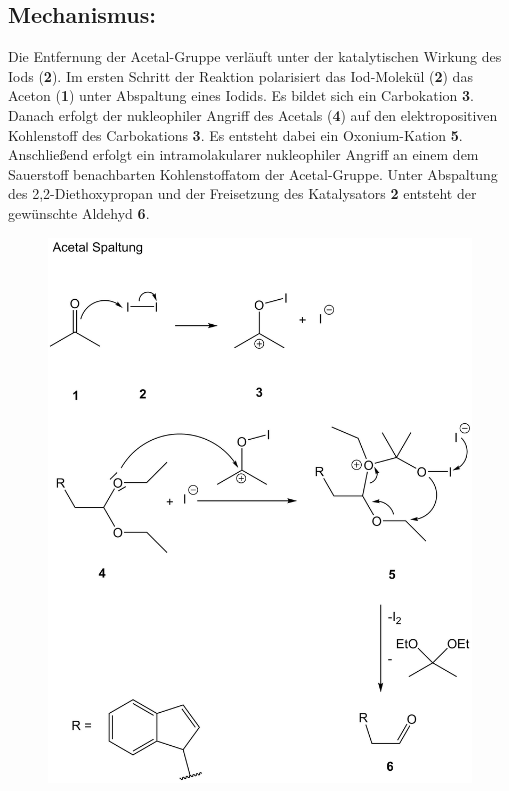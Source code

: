 \documentclass[12pt]{article}
\begin{document}
\begin{onehalfspace}
\section{Mechanismus\cite{bio}:}
Die Entfernung der Acetal-Gruppe verläuft unter der katalytischen Wirkung des Iods (\textbf{2}). 
Im ersten Schritt der Reaktion polarisiert das Iod-Molekül (\textbf{2}) das Aceton (\textbf{1}) unter Abspaltung eines Iodids. Es bildet sich ein Carbokation \textbf{3}. Danach erfolgt der nukleophiler Angriff des Acetals (\textbf{4}) auf den elektropositiven Kohlenstoff des Carbokations \textbf{3}. 
Es entsteht dabei ein Oxonium-Kation \textbf{5}. Anschließend erfolgt ein intramolakularer nukleophiler Angriff an einem dem Sauerstoff benachbarten Kohlenstoffatom der Acetal-Gruppe. Unter Abspaltung des 2,2-Diethoxypropan und der Freisetzung des Katalysators \textbf{2} entsteht der gewünschte Aldehyd \textbf{6}.
\noindent
\begin{figure}[!htbp]
\includegraphics[scale=0.25]{mechan.png}
\end{figure}


\end{onehalfspace}
\end{document}
